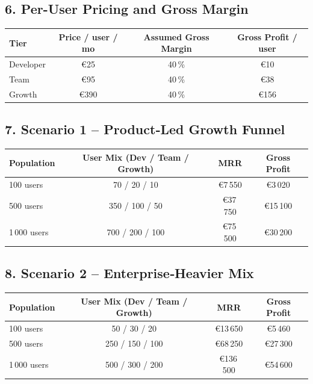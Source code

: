 \documentclass[11pt, a4paper, oneside]{article}
\begin{document}
\subsection*{6. Per-User Pricing and Gross Margin}
\begin{center}
\begin{tabular}{@{}lccc@{}}
\toprule
\textbf{Tier} & \textbf{Price / user / mo} & \textbf{Assumed Gross Margin} & \textbf{Gross Profit / user} \\
\midrule
Developer & €25 & 40\,\% & €10 \\
Team      & €95 & 40\,\% & €38 \\
Growth    & €390 & 40\,\% & €156 \\
\bottomrule
\end{tabular}
\end{center}

\subsection*{7. Scenario 1 – Product‑Led Growth Funnel}
\begin{center}
\begin{tabular}{@{}lccc@{}}
\toprule
\textbf{Population} & \textbf{User Mix} (Dev / Team / Growth) & \textbf{MRR} & \textbf{Gross Profit} \\
\midrule
100 users   & 70 / 20 / 10    & €7\,550   & €3\,020  \\
500 users   & 350 / 100 / 50  & €37\,750  & €15\,100 \\
1\,000 users & 700 / 200 / 100 & €75\,500  & €30\,200 \\
\bottomrule
\end{tabular}
\end{center}

\subsection*{8. Scenario 2 – Enterprise‑Heavier Mix}
\begin{center}
\begin{tabular}{@{}lccc@{}}
\toprule
\textbf{Population} & \textbf{User Mix} (Dev / Team / Growth) & \textbf{MRR} & \textbf{Gross Profit} \\
\midrule
100 users   & 50 / 30 / 20   & €13\,650  & €5\,460  \\
500 users   & 250 / 150 / 100 & €68\,250  & €27\,300 \\
1\,000 users & 500 / 300 / 200 & €136\,500 & €54\,600 \\
\bottomrule
\end{tabular}
\end{center}
\end{document}
